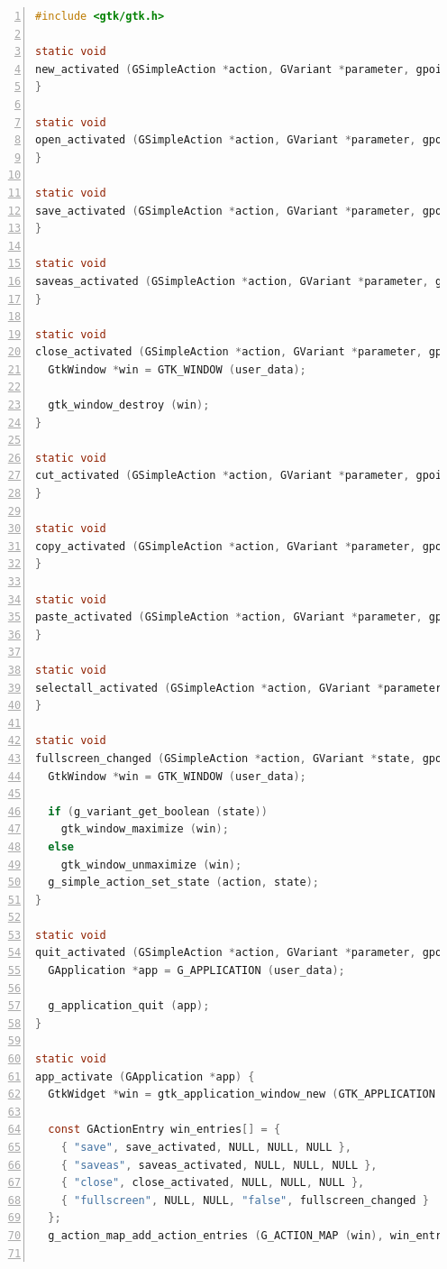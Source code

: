 \begin{lstlisting}[language=C, numbers=left]
#include <gtk/gtk.h>

static void
new_activated (GSimpleAction *action, GVariant *parameter, gpointer user_data) {
}

static void
open_activated (GSimpleAction *action, GVariant *parameter, gpointer user_data) {
}

static void
save_activated (GSimpleAction *action, GVariant *parameter, gpointer user_data) {
}

static void
saveas_activated (GSimpleAction *action, GVariant *parameter, gpointer user_data) {
}

static void
close_activated (GSimpleAction *action, GVariant *parameter, gpointer user_data) {
  GtkWindow *win = GTK_WINDOW (user_data);

  gtk_window_destroy (win);
}

static void
cut_activated (GSimpleAction *action, GVariant *parameter, gpointer user_data) {
}

static void
copy_activated (GSimpleAction *action, GVariant *parameter, gpointer user_data) {
}

static void
paste_activated (GSimpleAction *action, GVariant *parameter, gpointer user_data) {
}

static void
selectall_activated (GSimpleAction *action, GVariant *parameter, gpointer user_data) {
}

static void
fullscreen_changed (GSimpleAction *action, GVariant *state, gpointer user_data) {
  GtkWindow *win = GTK_WINDOW (user_data);

  if (g_variant_get_boolean (state))
    gtk_window_maximize (win);
  else
    gtk_window_unmaximize (win);
  g_simple_action_set_state (action, state);
}

static void
quit_activated (GSimpleAction *action, GVariant *parameter, gpointer user_data) {
  GApplication *app = G_APPLICATION (user_data);

  g_application_quit (app);
}

static void
app_activate (GApplication *app) {
  GtkWidget *win = gtk_application_window_new (GTK_APPLICATION (app));

  const GActionEntry win_entries[] = {
    { "save", save_activated, NULL, NULL, NULL },
    { "saveas", saveas_activated, NULL, NULL, NULL },
    { "close", close_activated, NULL, NULL, NULL },
    { "fullscreen", NULL, NULL, "false", fullscreen_changed }
  };
  g_action_map_add_action_entries (G_ACTION_MAP (win), win_entries, G_N_ELEMENTS (win_entries), win);


\end{lstlisting}
